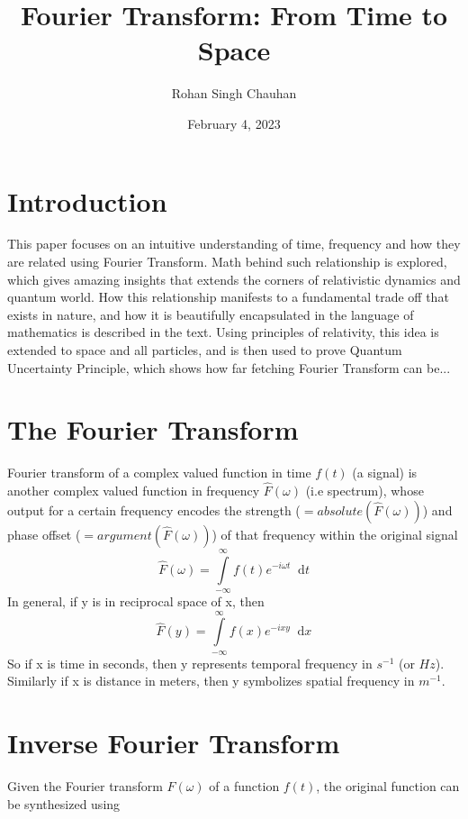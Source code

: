 \documentclass[11pt, a4paper]{article}
\title{Fourier Transform: From Time to Space}
\author{Rohan Singh Chauhan}
\date{February 4, 2023}
\let\oldsection\section
\renewcommand{\section}{%
	\setcounter{equation}{0}%
	\oldsection%
}
\newcommand{\diff}{\mathop{}\!\mathrm{d}}
\newcommand{\dx}{\diff x}
\newcommand{\dt}{\diff t}
\newcommand{\dint}[2]{\int \limits_{#1}^{#2}}  %
\newcommand{\intinfty}{\dint{-\infty}{\infty}}	%
\begin{document}
\maketitle

\section{Introduction}\label{sec:intro}
This paper focuses on an intuitive understanding of time, frequency and how they are related using Fourier Transform. Math behind such relationship is explored, which gives amazing insights that extends the corners of relativistic dynamics and quantum world. How this relationship manifests to a fundamental trade off that exists in nature, and how it is beautifully encapsulated in the language of mathematics is described in the text. Using principles of relativity, this idea is extended to space and all particles, and is then used to prove Quantum Uncertainty Principle, which shows how far fetching Fourier Transform can be...

\section{The Fourier Transform}\label{sec:fourier_transform}
Fourier transform of a complex valued function in time $f(t)$ (a signal) is another complex valued function in frequency $\hat{F}(\omega)$ (i.e spectrum), whose output for a certain frequency encodes the strength ($=absolute(\hat{F}(\omega))$) and phase offset ($=argument(\hat{F}(\omega))$) of that frequency within the original signal
\begin{equation}\label{eq:ft_def}
	\boxed{
		\hat{F}(\omega) = \intinfty f(t)e^{-i\omega t} \dt
	}
\end{equation}
In general, if y is in reciprocal space of x, then
\begin{equation*}\label{eq:ft_def_general}
	\hat{F}(y) = \intinfty f(x)e^{-ixy} \dx
\end{equation*}
So if x is time in seconds, then y represents temporal frequency in $s^{-1}$ (or $Hz$). Similarly if x is distance in meters, then y symbolizes spatial frequency in $m^{-1}$.

\section{Inverse Fourier Transform}\label{sec:inverse_fourier_transform}
Given the Fourier transform $\hat{F}(\omega)$ of a function $f(t)$, the original function can be synthesized using 
\end{document}
